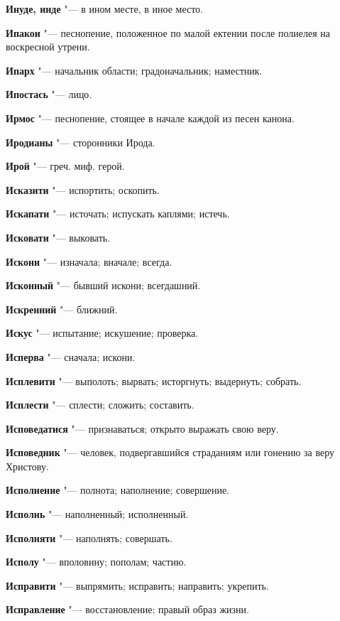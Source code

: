 \begin{mymulticols}
\noindent\textbf{Инуде, инде} "--- в ином месте, в иное место. 

\noindent\textbf{Ипакои} "--- песнопение, положенное по малой ектении после полиелея на воскресной утрени. 

\noindent\textbf{Ипарх} "--- начальник области; градоначальник; наместник. 

\noindent\textbf{Ипостась} "--- лицо. 

\noindent\textbf{Ирмос} "--- песнопение, стоящее в начале каждой из песен канона. 

\noindent\textbf{Иродианы} "--- сторонники Ирода. 

\noindent\textbf{Ирой} "--- греч. миф. герой. 

\noindent\textbf{Исказити} "--- испортить; оскопить. 

\noindent\textbf{Искапати} "--- источать; испускать каплями; истечь. 

\noindent\textbf{Исковати} "--- выковать. 

\noindent\textbf{Искони} "--- изначала; вначале; всегда. 

\noindent\textbf{Исконный} "--- бывший искони; всегдашний. 

\noindent\textbf{Искренний} "--- ближний. 

\noindent\textbf{Искус} "--- испытание; искушение; проверка. 

\noindent\textbf{Исперва} "--- сначала; искони. 

\noindent\textbf{Исплевити} "--- выполоть; вырвать; исторгнуть; выдернуть; собрать. 

\noindent\textbf{Исплести} "--- сплести; сложить; составить. 

\noindent\textbf{Исповедатися} "--- признаваться; открыто выражать свою веру. 

\noindent\textbf{Исповедник} "--- человек, подвергавшийся страданиям или гонению за веру Христову. 

\noindent\textbf{Исполнение} "--- полнота; наполнение; совершение. 

\noindent\textbf{Исполнь} "--- наполненный; исполненный. 

\noindent\textbf{Исполняти} "--- наполнять; совершать. 

\noindent\textbf{Исполу} "--- вполовину; пополам; частию. 

\noindent\textbf{Исправити} "--- выпрямить; исправить; направить; укрепить. 

\noindent\textbf{Исправление} "--- восстановление; правый образ жизни. 


\end{mymulticols}

